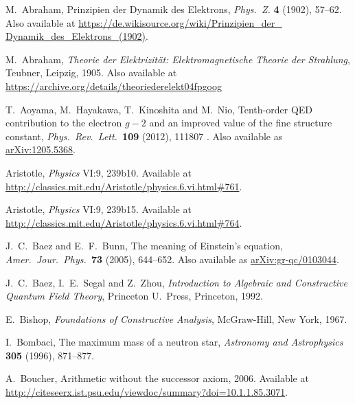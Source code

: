 \documentclass[12pt]{article}
\begin{document}
\begin{thebibliography}{10}

 M.\ Abraham, Prinzipien der Dynamik des Elektrons, \textsl{Phys.\ Z.} \textbf{4} (1902), 57--62.  Also available at \href{https://de.wikisource.org/wiki/Prinzipien_der_Dynamik_des_Elektrons_\%281902\%29}{https://de.wikisource.org/wiki/Prinzipien\_der\_ \hfill \break Dynamik\_des\_Elektrons\_(1902)}.

 M.\ Abraham, \textsl{Theorie der Elektrizit\"at: Elektromagnetische Theorie der Strahlung}, Teubner, Leipzig, 1905.  Also available at 
\href{https://archive.org/details/theoriederelekt04fpgoog}{https://archive.org/details/theoriederelekt04fpgoog}

 T.\ Aoyama, M.\ Hayakawa, T.\ Kinoshita and M.\ Nio, Tenth-order QED contribution to the electron $g-2$ and an improved value of the fine structure constant, \textsl{Phys.\ Rev.\ Lett.\ }\textbf{109} (2012), 111807 . Also available as \href{http://arxiv.org/abs/1205.5368}{arXiv:1205.5368}.

 Aristotle, \textsl{Physics} VI:9, 239b10.  Available at  \href{http://classics.mit.edu/Aristotle/physics.6.vi.html\#761}{http://classics.mit.edu/\break Aristotle/physics.6.vi.html\#761}.
 
 Aristotle, \textsl{Physics} VI:9, 239b15.  Available at \href{http://classics.mit.edu/Aristotle/physics.6.vi.html\#764}{http://classics.mit.edu/\break Aristotle/physics.6.vi.html\#764}.

 J.\ C.\ Baez and E.\ F.\ Bunn, The meaning of Einstein's equation, \textsl{Amer.\ Jour.\ Phys.\ }\textbf{73} (2005), 644--652.   Also available as \href{http://arxiv.org/abs/gr-qc/0103044}{arXiv:gr-qc/0103044}.
 
 J.\ C.\ Baez, I.\ E.\ Segal and Z.\ Zhou, \textsl{Introduction to 
Algebraic and Constructive Quantum Field Theory}, Princeton U.\ Press, Princeton, 1992.

 E.\ Bishop, \textsl{Foundations of Constructive Analysis}, McGraw-Hill, New York, 1967.

 I.\ Bombaci, The maximum mass of a neutron star, \textsl{ Astronomy and Astrophysics} \textbf{305} (1996), 871--877.

 A.\ Boucher, Arithmetic without the successor axiom, 2006.
Available at \href{http://citeseerx.ist.psu.edu/viewdoc/summary?doi=10.1.1.85.3071}{http://citeseerx.ist.psu.edu/viewdoc/summary?doi=10.1.1.85.3071}.


\end{thebibliography}
\end{document}
